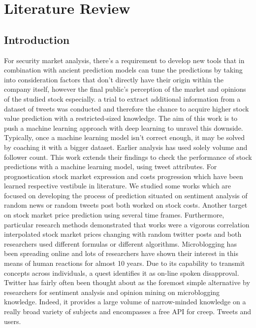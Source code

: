 \chapter{Literature Review}

\section{Introduction}
For security market analysis, there’s a requirement to develop new tools that in combination with ancient prediction models can tune the predictions by taking into consideration factors that don’t directly have their origin within the company itself, however the final public’s perception of the market and opinions of the studied stock especially. a trial to extract additional information from a dataset of tweets was conducted and therefore the chance to acquire higher stock value prediction with a restricted-sized knowledge. The aim of this work is to push a machine learning approach with deep learning to unravel this downside. Typically, once a machine learning model isn’t correct enough, it may be solved by coaching it with a bigger dataset. Earlier analysis has used solely volume and follower count. This work extends their findings to check the performance of stock predictions with a machine learning model, using tweet attributes. For prognostication stock market expression and costs progression which have been learned respective vestibule in literature. We studied some works which are focused on developing the process of prediction situated on sentiment analysis of random news or random tweets post both worked on stock costs. Another target on stock market price prediction using several time frames. Furthermore, particular research methods demonstrated that works were a vigorous correlation interpolated stock market prices changing with random twitter posts and both researchers used different formulas or different algorithms. Microblogging has been spreading online and lots of researchers have shown their interest in this means of human reactions for almost 10 years. Due to its capability to transmit concepts across individuals, a quest identifies it as on-line spoken disapproval. Twitter has fairly often been thought about as the foremost simple alternative by researchers for sentiment analysis and opinion mining on microblogging knowledge. Indeed, it provides a large volume of narrow-minded knowledge on a really broad variety of subjects and encompasses a free API for creep. Tweets and users.\\

